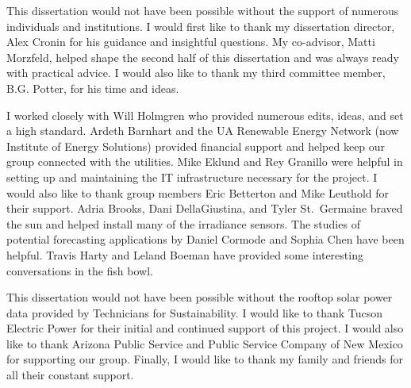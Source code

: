 This dissertation would not have been possible without the support of
numerous individuals and institutions.
I would first like to thank my dissertation director, Alex Cronin for
his guidance and insightful questions.
My co-advisor, Matti Morzfeld, helped shape the second half of this
dissertation and was always ready with practical advice.
I would also like to thank my third committee member, B.G. Potter, for
his time and ideas.

I worked closely with Will Holmgren who provided numerous edits,
ideas, and set a high standard.
Ardeth Barnhart and the UA Renewable Energy Network (now Institute of
Energy Solutions) provided financial support and helped keep our group
connected with the utilities.
Mike Eklund and Rey Granillo were helpful in setting up and
maintaining the IT infrastructure necessary for the project.
I would also like to thank group members Eric Betterton and Mike
Leuthold for their support.
Adria Brooks, Dani DellaGiustina, and Tyler St.\ Germaine braved the
sun and helped install many of the irradiance sensors.
The studies of potential forecasting applications by Daniel Cormode
and Sophia Chen have been helpful.
Travis Harty and Leland Boeman have provided some interesting
conversations in the fish bowl.

This dissertation would not have been possible without the rooftop
solar power data provided by Technicians for Sustainability.
I would like to thank Tucson Electric Power for their initial and
continued support of this project.
I would also like to thank Arizona Public Service and Public Service
Company of New Mexico for supporting our group.
Finally, I would like to thank my family and friends for all their
constant support.



